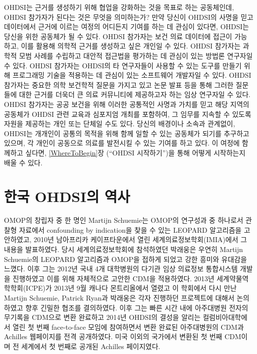\documentclass[10.5pt]{book}
\theoremstyle{definition}
\theoremstyle{definition}
\theoremstyle{definition}
\theoremstyle{remark}
\begin{document}
OHDSI는 근거를 생성하기 위해 협업을 강화하는 것을 목표로 하는
공동체인데, OHDSI 참가자가 된다는 것은 무엇을 의미하는가? 만약 당신이
OHDSI의 사명을 믿고 데이터에서 근거에 이르는 여정의 어디든지 기여를 하는
데 관심이 있다면, OHDSI는 당신을 위한 공동체가 될 수 있다. OHDSI
참가자는 보건 의료 데이터에 접근이 가능하고, 이를 활용해 의학적 근거를
생성하고 싶은 개인일 수 있다. OHDSI 참가자는 과학적 모범 사례를 수립하고
대안적 접근법을 평가하는 데 관심이 있는 방법론 연구자일 수 있다. OHDSI
참가자는 OHDSI의 타 연구자들이 사용할 수 있는 도구를 만들기 위해
프로그래밍 기술을 적용하는 데 관심이 있는 소프트웨어 개발자일 수 있다.
OHDSI 참가자는 중요한 의학 보건학적 질문을 가지고 있고 논문 발표 등을
통해 그러한 질문들에 대한 근거를 더욱더 큰 의료 커뮤니티에 제공하고자
하는 임상 연구자일 수 있다. OHDSI 참가자는 공공 보건을 위해 이러한
공통적인 사명과 가치를 믿고 해당 지역의 공동체가 OHDSI 관련 교육과
심포지엄 개최를 포함하여, 그 임무를 지속할 수 있도록 자원을 제공하는
개인 또는 단체일 수도 있다. 당신의 배경이나 소속과 관계없이, OHDSI는
개개인이 공통의 목적을 위해 함께 일할 수 있는 공동체가 되기를 추구하고
있으며, 각 개인이 공동으로 의료를 발전시킬 수 있는 기여를 하고 있다. 이
여정에 함께하고 싶다면, \ref{WhereToBegin}장 (``OHDSI 시작하기'')을 통해
어떻게 시작하는지 배울 수 있다.

\section{한국 OHDSI의 역사}\label{-ohdsi-}

OMOP의 창립자 중 한 명인 Martijn Schuemie는 OMOP의 연구성과 중 하나로서
관찰형 자료에서 confounding by indication을 찾을 수 있는 LEOPARD
알고리즘을 고안하였고, 2010년 남아프리카 케이프타운에서 열린
세계의료정보학회(IMIA)에서 그 내용을 발표하였다. 당시 세계의료정보학회에
참석하였던 박래웅은 우연히 Martijn Schuemie의 LEOPARD 알고리즘과 OMOP을
접하게 되었고 강한 흥미와 유대감을 느꼈다. 이후 그는 2012년 국내 4개
대학병원의 다기관 임상 의료정보 통합시스템 개발을 진행하였고 이를 위해
자체적으로 고안한 CDM을 적용하였다. 2013년 세계약물역학학회(ICPE)가
2013년 9월 캐나다 몬트리올에서 열렸고 이 학회에서 다시 만난 Martijn
Schuemie, Patrick Ryan과 박래웅은 각자 진행하던 프로젝트에 대해서
논의하였고 향후 긴밀한 협조를 결의하였다. 이후 그는 빠른 시간 내에
아주대병원 전자의무기록을 CDM으로 변환 완료하고 2014년 OHDSI의 결성을
알리는 컬럼비아대학에서 열린 첫 번째 face-to-face 모임에 참여하면서 변환
완료된 아주대병원의 CDM과 Achilles 웹페이지를 전격 공개하였다. 미국
이외의 국가에서 변환된 첫 번째 CDM이며 전 세계에서 첫 번째로 공개된
Achilles 페이지였다.
\end{document}
